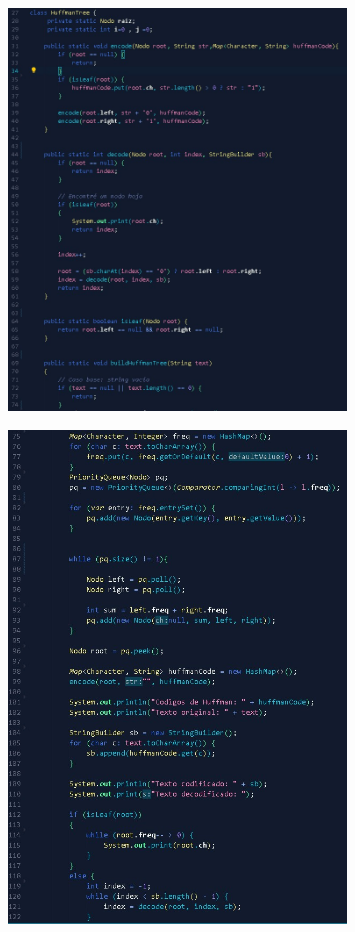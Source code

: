 \documentclass{article}
\begin{document}
	\begin{figure}[H]
		\centering
		\includegraphics[width=0.8\textwidth,keepaspectratio]{img/codigo2.jpg}	
	\end{figure}
	\begin{figure}[H]
		\centering
		\includegraphics[width=0.8\textwidth,keepaspectratio]{img/codigo2b.jpg}	
	\end{figure}
\end{document}
